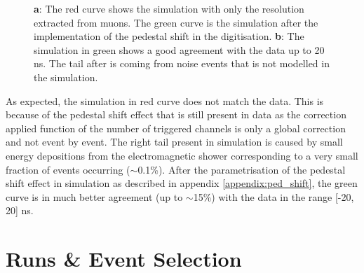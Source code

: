 \documentclass[twoside,a4paper,11pt]{article}
\begin{document}
\begin{figure}[htbp]
	\hfill
	\caption[]{\textbf{a}: The red curve shows the simulation with only the resolution extracted from muons. The green curve is the simulation after the implementation of the pedestal shift in the digitisation. \textbf{b}: The simulation in green shows a good agreement with the data up to 20 ns. The tail after is coming from noise events that is not modelled in the simulation.}
	\label{fig:sim_data_elec}
\end{figure}
As expected, the simulation in red curve does not match the data. This is because of the pedestal shift effect that is still present in data as the correction applied function of the number of triggered channels is only a global correction and not event by event. The right tail present in simulation is caused by small energy depositions from the electromagnetic shower corresponding to a very small fraction of events occurring ($\sim$0.1\%).
After the parametrisation of the pedestal shift effect in simulation as described in appendix \ref{appendix:ped_shift}, the green curve is in much better agreement (up to $\sim$15\%) with the data in the range [-20, 20] ns.

\section{Runs \& Event Selection}
 
\end{document}
